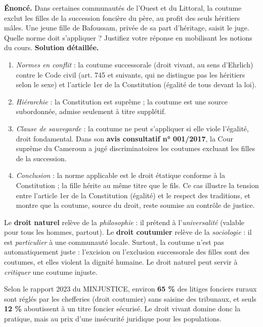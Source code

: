 \documentclass[11pt]{article}
\begin{document}
\begin{exoresolu}
\textbf{Énoncé.} Dans certaines communautés de l'Ouest et du Littoral, la coutume exclut les filles de la succession foncière du père, au profit des seuls héritiers mâles. Une jeune fille de Bafoussam, privée de sa part d'héritage, saisit le juge. Quelle norme doit s'appliquer ? Justifiez votre réponse en mobilisant les notions du cours.
\tcblower
\textbf{Solution détaillée.}
\begin{enumerate}
\item \emph{Normes en conflit} : la coutume successorale (droit vivant, au sens d'Ehrlich) contre le Code civil (art. 745 et suivants, qui ne distingue pas les héritiers selon le sexe) et l'article 1er de la Constitution (égalité de tous devant la loi).
\item \emph{Hiérarchie} : la Constitution est suprême ; la coutume est une source subordonnée, admise seulement à titre supplétif.
\item \emph{Clause de sauvegarde} : la coutume ne peut s'appliquer si elle viole l'égalité, droit fondamental. Dans son \textbf{avis consultatif n° 001/2017}, la Cour suprême du Cameroun a jugé discriminatoires les coutumes excluant les filles de la succession.
\item \emph{Conclusion} : la norme applicable est le droit étatique conforme à la Constitution ; la fille hérite au même titre que le fils. Ce cas illustre la tension entre l'article 1er de la Constitution (égalité) et le respect des traditions, et montre que la coutume, source du droit, reste soumise au contrôle de justice.
\end{enumerate}
\end{exoresolu}

\begin{attention}
Le \textbf{droit naturel} relève de la \emph{philosophie} : il prétend à l'\emph{universalité} (valable pour tous les hommes, partout). Le \textbf{droit coutumier} relève de la \emph{sociologie} : il est \emph{particulier} à une communauté locale. Surtout, la coutume n'est pas automatiquement juste : l'excision ou l'exclusion successorale des filles sont des coutumes, et elles violent la dignité humaine. Le droit naturel peut servir à \emph{critiquer} une coutume injuste.
\end{attention}

\begin{exemplebox}
Selon le rapport 2023 du MINJUSTICE, environ \textbf{65 \%} des litiges fonciers ruraux sont réglés par les chefferies (droit coutumier) sans saisine des tribunaux, et seuls \textbf{12 \%} aboutissent à un titre foncier sécurisé. Le droit vivant domine donc la pratique, mais au prix d'une insécurité juridique pour les populations.
\end{exemplebox}
\end{document}
